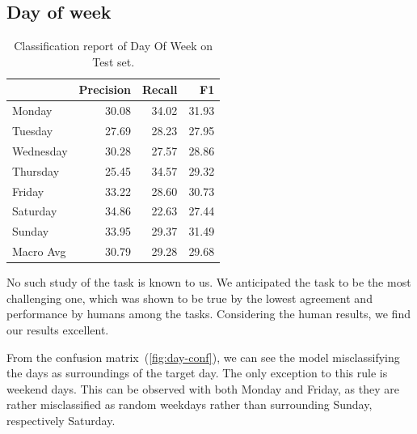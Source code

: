 \subsection{Day of week}
\begin{table}[h]
    \centering\footnotesize\sf
    \begin{tabular}{lrrr}
        \toprule
        {}        & Precision & Recall & F1    \\
        \midrule
        Monday    & 30.08     & 34.02  & 31.93 \\
        Tuesday   & 27.69     & 28.23  & 27.95 \\
        Wednesday & 30.28     & 27.57  & 28.86 \\
        Thursday  & 25.45     & 34.57  & 29.32 \\
        Friday    & 33.22     & 28.60  & 30.73 \\
        Saturday  & 34.86     & 22.63  & 27.44 \\
        Sunday    & 33.95     & 29.37  & 31.49 \\
        Macro Avg & 30.79     & 29.28  & 29.68 \\
        \bottomrule
    \end{tabular}
    \caption{Classification report of Day Of Week on Test set.}
    \label{tab:classification-report-day}
\end{table}
No such study of the task is known to us. We anticipated the task to be the most challenging one,
which was shown to be true by the lowest agreement and performance by humans among the tasks. Considering
the human results, we find our results excellent.

From the confusion matrix~(\autoref{fig:day-conf}), we can see the model misclassifying the days
as surroundings of the target day. The only exception to this rule
is weekend days. This can be observed with both Monday and Friday, as they are
rather misclassified as random weekdays rather than surrounding Sunday, respectively
Saturday.